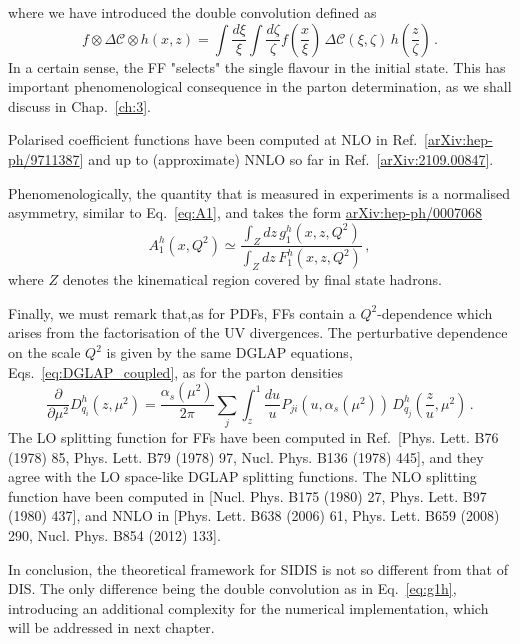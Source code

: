 where we have introduced the double convolution defined as 
\begin{equation}
  f \otimes \Delta \mathcal{C} \otimes h (x,z) = \int \frac{d\xi}{\xi} \int \frac{d \zeta} {\zeta} f \left( \frac{x}{\xi}\right)  \, \Delta \mathcal{C} \left(\xi, \zeta\right) \, h \left( \frac{z}{\zeta} \right) \,.
\end{equation}
In a certain sense, the FF "selects" the single flavour in the initial state. This has important phenomenological consequence in the parton determination, as we shall discuss in Chap.~\ref*{ch:3}.\par
Polarised coefficient functions have been computed at NLO in Ref.~[\href{https://arxiv.org/abs/hep-ph/9711387v1}{arXiv:hep-ph/9711387}] and up to (approximate) NNLO so far in Ref.~[\href{https://arxiv.org/abs/2109.00847v2}{arXiv:2109.00847}].\par
Phenomenologically, the quantity that is measured in experiments is a normalised asymmetry, similar to Eq.~\eqref{eq:A1}, and takes the form \href{https://arxiv.org/abs/hep-ph/0007068}{arXiv:hep-ph/0007068}
\begin{equation}
  A_1^{h}(x,Q^2) \simeq  \frac{\int_{Z} dz \, g_1^h (x,z,Q^2)}{\int_{Z} dz \, F_1^h (x,z,Q^2)} \,,
\end{equation}
where $Z$ denotes the kinematical region covered by final state hadrons.\par
Finally, we must remark that,as for PDFs, FFs contain a $Q^2$-dependence which arises from the factorisation of the UV divergences. The perturbative dependence on the scale $Q^2$ is given by the same DGLAP equations, Eqs.~\eqref{eq:DGLAP_coupled}, as for the parton densities
\begin{equation}
  \frac{\partial}{\partial \mu^2} D_{q_i}^{h} (z,\mu^2) = \frac{\alpha_s(\mu^2)}{2\pi} \sum_{j} \int_{z}^{1} \frac{du}{u} P_{ji}\left( u, \alpha_s(\mu^2) \right) \, D_{q_j}^h \left( \frac{z}{u}, \mu^2 \right) \,.
\end{equation}
The LO splitting function for FFs have been computed in Ref.~[Phys. Lett. B76 (1978) 85, Phys. Lett. B79 (1978) 97, Nucl. Phys. B136 (1978) 445], and they agree with the
LO space-like DGLAP splitting functions. The NLO splitting function have been computed in [Nucl. Phys. B175 (1980) 27, Phys. Lett. B97 (1980) 437], and NNLO in [Phys. Lett. B638 (2006) 61, Phys. Lett. B659 (2008) 290, Nucl. Phys. B854 (2012) 133].\par
In conclusion, the theoretical framework for SIDIS is not so different from that of DIS. The only difference being the double convolution as in Eq.~\eqref{eq:g1h}, introducing an additional complexity for the numerical implementation, which will be addressed in next chapter.